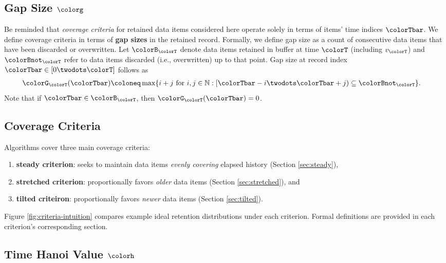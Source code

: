 \subsection{Gap Size $\colorg$}
\label{sec:notation-gapsize}

Be reminded that \textit{coverage criteria} for retained data items considered here operate solely in terms of items' time indices $\colorTbar$.
We define coverage criteria in terms of \textbf{gap sizes} in the retained record.
Formally, we define gap size as a count of consecutive data items that have been discarded or overwritten.
Let $\colorB_{\colorT}$ denote data items retained in buffer at time $\colorT$ (including $v_{\colorT}$) and $\colorBnot_{\colorT}$ refer to data items discarded (i.e., overwritten) up to that point.
Gap size at record index $\colorTbar \in [0 \twodots \colorT]$ follows as
\begin{align}
\colorG_{\colorT}(\colorTbar)
&\coloneq
\max
\{
  i + j
  \text{ for }
  i, j \in \mathbb{N}
  :
  [\colorTbar-i \twodots \colorTbar+j) \subseteq \colorBnot_{\colorT}
\}.
\label{eqn:gap-size-defn}
\end{align}
Note that if $\colorTbar \in \colorB_{\colorT}$, then $\colorG_{\colorT}(\colorTbar) = 0$.

\subsection{Coverage Criteria}
\label{sec:notation-coverage}

Algorithms cover three main coverage criteria:
\begin{enumerate}
\item \textbf{steady criterion}: seeks to maintain data items \textit{evenly covering} elapsed history (Section \ref{sec:steady}),
\item \textbf{stretched criterion}: proportionally favors \textit{older} data items (Section \ref{sec:stretched}), and
\item \textbf{tilted criteiron}: proportionally favors \textit{newer} data items (Section \ref{sec:tilted}).
\end{enumerate}
Figure \ref{fig:criteria-intuition} compares example ideal retention distributions under each criterion.
Formal definitions are provided in each criterion's corresponding section.

\subsection{Time Hanoi Value $\colorh$}
\label{sec:notation-hanoi}

